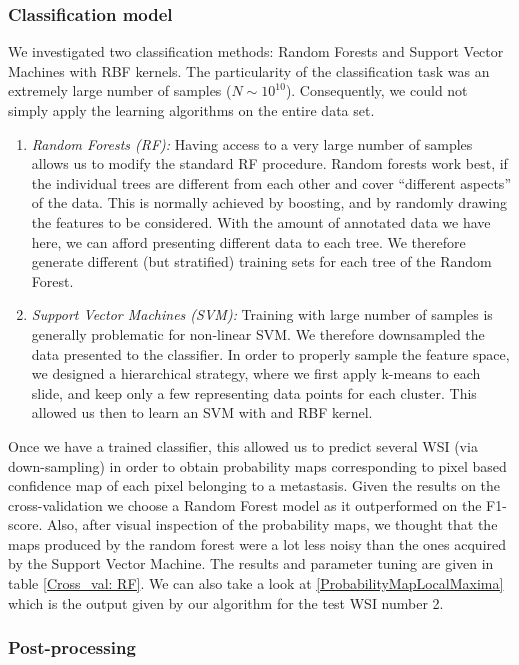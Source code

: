 \documentclass[a4paper,10pt]{article}
\begin{document}
\subsubsection*{Classification model}
We investigated two classification methods: Random Forests and Support
Vector Machines with RBF kernels. The particularity of the
classification task was an extremely large number of samples ($N \sim  10^{10}$).
Consequently, we could not simply apply the learning algorithms on the
entire data set.  
\begin{enumerate}
\item {\it Random Forests (RF):} Having access to a very large number of
  samples allows us to modify the standard RF procedure. Random
  forests work best, if the individual trees are different from each
  other and cover ``different aspects'' of the data. This is normally
  achieved by boosting, and by randomly drawing the features to be
  considered. With the amount of annotated data we have here, we can
  afford presenting different data to each tree. We therefore generate
  different (but stratified) training sets for each tree of the Random
  Forest.  
\item {\it Support Vector Machines (SVM):} Training with large number
  of samples is generally problematic for non-linear SVM. We therefore
  downsampled the data presented to the classifier. In order to
  properly sample the feature space, we designed a hierarchical
  strategy, where we first apply k-means to each slide, and keep only
  a few representing data points for each cluster. This allowed us
  then to learn an SVM with and RBF kernel. 
\end{enumerate}

Once we have a trained classifier, this allowed us to predict several WSI (via down-sampling) in order to obtain probability maps corresponding to pixel based confidence map of each pixel belonging to a metastasis. Given the results on the cross-validation we choose a Random Forest model as it outperformed on the F1-score. Also, after visual inspection of the probability maps, we thought that the maps produced by the random forest were a lot less noisy than the ones acquired by the Support Vector Machine. The results and parameter tuning are given in table \ref{Cross_val: RF}. We can also take a look at \ref{ProbabilityMapLocalMaxima} which is the output given by our algorithm for the test WSI number 2.

\subsubsection*{Post-processing}
\end{document}
